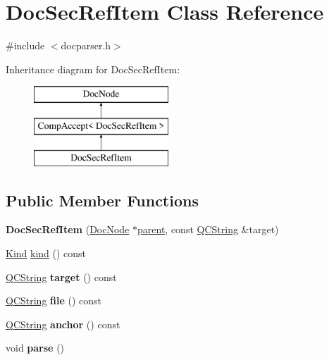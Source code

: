 \hypertarget{class_doc_sec_ref_item}{}\section{Doc\+Sec\+Ref\+Item Class Reference}
\label{class_doc_sec_ref_item}


{\ttfamily \#include $<$docparser.\+h$>$}

Inheritance diagram for Doc\+Sec\+Ref\+Item\+:\begin{figure}[H]
\begin{center}
\leavevmode
\includegraphics[height=3.000000cm]{class_doc_sec_ref_item}
\end{center}
\end{figure}
\subsection*{Public Member Functions}
\begin{DoxyCompactItemize}
\item 
\mbox{\label{class_doc_sec_ref_item_a7c6861a721b3168cebab8059e571c475}} 
{\bfseries Doc\+Sec\+Ref\+Item} (\mbox{\hyperlink{class_doc_node}{Doc\+Node}} $\ast$\mbox{\hyperlink{class_doc_node_a73e8ad29a91cfceb0968eb00db71a23d}{parent}}, const \mbox{\hyperlink{class_q_c_string}{Q\+C\+String}} \&target)
\item 
\mbox{\hyperlink{class_doc_node_aebd16e89ca590d84cbd40543ea5faadb}{Kind}} \mbox{\hyperlink{class_doc_sec_ref_item_af0f20ee986f4b4bb4a126b8bb55e16b4}{kind}} () const
\item 
\mbox{\label{class_doc_sec_ref_item_a66a669e5594d41dd50d2c9ebbebc85e7}} 
\mbox{\hyperlink{class_q_c_string}{Q\+C\+String}} {\bfseries target} () const
\item 
\mbox{\label{class_doc_sec_ref_item_a751e1df43138d68817a38c68e5e066fc}} 
\mbox{\hyperlink{class_q_c_string}{Q\+C\+String}} {\bfseries file} () const
\item 
\mbox{\label{class_doc_sec_ref_item_ab9aa2458393645fd08a33ea58c4b4cca}} 
\mbox{\hyperlink{class_q_c_string}{Q\+C\+String}} {\bfseries anchor} () const
\item 
\mbox{\label{class_doc_sec_ref_item_a35c9d6d150e7faaa88ea9ddfbeadb777}} 
void {\bfseries parse} ()
\end{DoxyCompactItemize}
